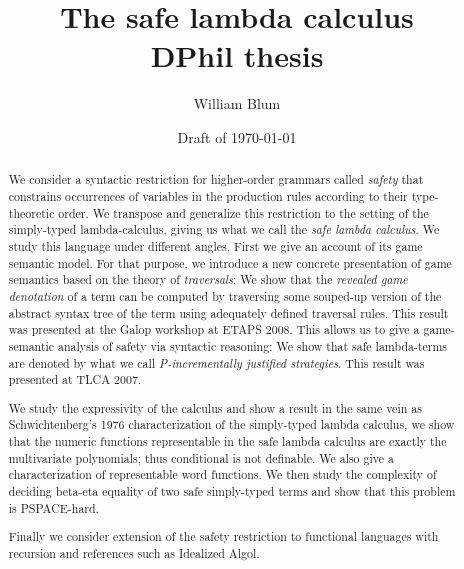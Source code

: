 


\makeindex

%

%
%

\author{William Blum}
\title{The safe lambda calculus  \\{\small DPhil thesis}}
\renewcommand{\crest}{\beltcrest}

\date{Draft of \today}

\setcounter{secnumdepth}{3}
\setcounter{tocdepth}{3}


\maketitle

\begin{abstract}
We consider a syntactic restriction for higher-order grammars called \emph{safety}  that  constrains occurrences of variables in the production rules according to their type-theoretic order. We transpose and generalize this restriction to the setting of the simply-typed lambda-calculus, giving us what we call the \emph{safe lambda calculus}. We study this language under different angles. First we give an account of its game semantic model. For that purpose, we introduce a new concrete presentation of game semantics based on the theory of \emph{traversals}: We show that the \emph{revealed game denotation} of a term can be computed by traversing some souped-up version of the abstract syntax tree of the term using adequately defined traversal rules. This result was presented at the Galop workshop at ETAPS 2008. This allows us to give a game-semantic analysis of safety via syntactic reasoning: We show that  safe lambda-terms are denoted by what we call \emph{P-incrementally justified strategies}. This result was presented at TLCA 2007.

We study the expressivity of the calculus and show a result in the
same vein as Schwichtenberg's 1976 characterization of the
simply-typed lambda calculus, we show that the numeric functions
representable in the safe lambda calculus are exactly the
multivariate polynomials; thus conditional is not definable. We
also give a characterization of representable word functions.
We then study the complexity of deciding beta-eta equality of two safe simply-typed terms and show that this problem is PSPACE-hard.

Finally we consider extension of the safety restriction to functional languages with recursion and references such as Idealized Algol.

\end{abstract}

